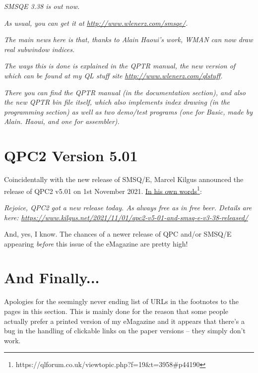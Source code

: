 \emph{SMSQE 3.38 is out now.}

\emph{As usual, you can get it at \href{http://www.wlenerz.com/smsqe/}{http://www.wlenerz.com/smsqe/}.}

\emph{The main news here is that, thanks to Alain Haoui's work, WMAN
can now draw real subwindow indices.}

\emph{The ways this is done is explained in the QPTR manual, the new
version of which can be found at my QL stuff site \href{http://www.wlenerz.com/qlstuff}{http://www.wlenerz.com/qlstuff}.}

\emph{There you can find the QPTR manual (in the documentation section),
and also the new QPTR bin file itself, which also implements index
drawing (in the programming section) as well as two demo/test programs
(one for Basic, made by Alain. Haoui, and one for assembler).}

\section{QPC2 Version 5.01}

Coincidentally with the new release of SMSQ/E, Marcel Kilgus announced
the release of QPC2 v5.01 on 1st November 2021. \href{https://qlforum.co.uk/viewtopic.php?f=19&t=3958\#p44190}{In his own words}\footnote{https://qlforum.co.uk/viewtopic.php?f=19\&t=3958\#p44190}:

\emph{Rejoice, QPC2 got a new release today. As always free as in
\textquotedbl free beer\textquotedbl . Details are here: \href{https://www.kilgus.net/2021/11/01/qpc2-v5-01-and-smsq-e-v3-38-released/}{https://www.kilgus.net/2021/11/01/qpc2-v5-01-and-smsq-e-v3-38-released/}}

And, yes, I know. The chances of a newer release of QPC and/or SMSQ/E
appearing \emph{before} this issue of the eMagazine are pretty high!

\section{And Finally...}

Apologies for the seemingly never ending list of URLs in the footnotes
to the pages in this section. This is mainly done for the reason that
some people actually prefer a printed version of my eMagazine and
it appears that there's a bug in the handling of clickable links on
the paper versions -- they simply don't work.
